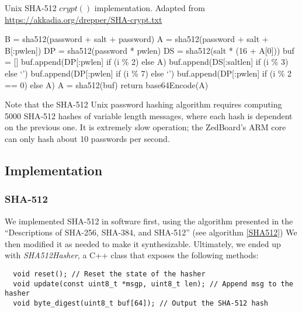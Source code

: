 \begin{algorithm}[!htb]
  \label{SHA512-unix}
  \caption{Unix SHA-512 $crypt()$ implementation. Adapted from \url{https://akkadia.org/drepper/SHA-crypt.txt}}
  \begin{algorithmic}
    \State B = sha512(password + salt + password)
    \State A = sha512(password + salt + B[:pwlen])
    \State DP = sha512(password * pwlen)
    \State DS = sha512(salt * (16 + A[0]))
      \State buf = []
      \State buf.append(DP[:pwlen] if (i \% 2) else A)
      \State buf.append(DS[:saltlen] if (i \% 3) else ‘’)
      \State buf.append(DP[:pwlen] if (i \% 7) else ‘’)
      \State buf.append(DP[:pwlen] if (i \% 2 == 0) else A)
      \State A = sha512(buf)
    \EndFor
    \State return base64Encode(A)
    \EndProcedure
  \end{algorithmic}
\end{algorithm}

Note that the SHA-512 Unix password hashing algorithm requires computing 5000
SHA-512 hashes of variable length messages, where each hash is dependent on the previous one.
It is extremely slow operation; the ZedBoard's ARM core can only hash about 10 passwords per second.

\subsection{Implementation}
\subsubsection{SHA-512}
We implemented SHA-512 in software first, using the algorithm presented in the ``Descriptions of SHA-256, SHA-384, and SHA-512'' (see algorithm \ref{SHA512})
We then modified it as needed to make it synthesizable. Ultimately, we ended up with \emph{SHA512Hasher}, a C++ class that exposes the following methods:
\begin{verbatim}
  void reset(); // Reset the state of the hasher
  void update(const uint8_t *msgp, uint8_t len); // Append msg to the hasher
  void byte_digest(uint8_t buf[64]); // Output the SHA-512 hash
\end{verbatim}

